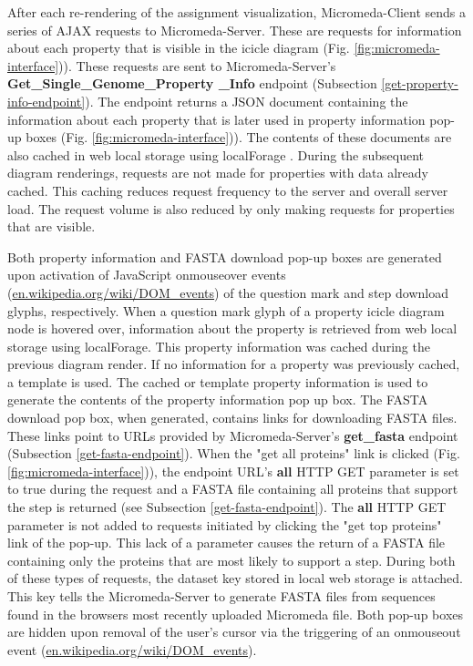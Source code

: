 After each re-rendering of the assignment visualization, Micromeda-Client sends a series of AJAX requests to Micromeda-Server. These are requests for information about each property that is visible in the icicle diagram (Fig. \ref{fig:micromeda-interface})). These requests are sent to Micromeda-Server's \textbf{Get\_Single\_Genome\_Property \_Info} endpoint (Subsection \ref{get-property-info-endpoint}). The endpoint returns a JSON document containing the information about each property that is later used in property information pop-up boxes (Fig. \ref{fig:micromeda-interface})). The contents of these documents are also cached in web local storage using localForage \cite{localforage}. During the subsequent diagram renderings, requests are not made for properties with data already cached. This caching reduces request frequency to the server and overall server load. The request volume is also reduced by only making requests for properties that are visible.

Both property information and FASTA download pop-up boxes are generated upon activation of JavaScript onmouseover events \cite{dom-events} (\href{en.wikipedia.org/wiki/DOM\_events}{en.wikipedia.org/wiki/DOM\_events}) of the question mark and step download glyphs, respectively. When a question mark glyph of a property icicle diagram node is hovered over, information about the property is retrieved from web local storage using localForage. This property information was cached during the previous diagram render. If no information for a property was previously cached, a template is used. The cached or template property information is used to generate the contents of the property information pop up box. The FASTA download pop box, when generated, contains links for downloading FASTA files. These links point to URLs provided by Micromeda-Server's \textbf{get\_fasta} endpoint (Subsection \ref{get-fasta-endpoint}). When the "get all proteins" link is clicked (Fig. \ref{fig:micromeda-interface})), the endpoint URL's \textbf{all} HTTP GET parameter is set to true during the request and a FASTA file containing all proteins that support the step is returned (see Subsection \ref{get-fasta-endpoint}). The \textbf{all} HTTP GET parameter is not added to requests initiated by clicking the "get top proteins" link of the pop-up. This lack of a parameter causes the return of a FASTA file containing only the proteins that are most likely to support a step. During both of these types of requests, the dataset key stored in local web storage is attached. This key tells the Micromeda-Server to generate FASTA files from sequences found in the browsers most recently uploaded Micromeda file. Both pop-up boxes are hidden upon removal of the user's cursor via the triggering of an onmouseout event \cite{dom-events} (\href{en.wikipedia.org/wiki/DOM\_events}{en.wikipedia.org/wiki/DOM\_events}).

